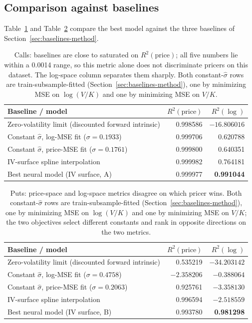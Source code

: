 \documentclass[11pt]{article}
\begin{document}
\subsection{Comparison against baselines}
\label{sec:results-baselines}
Table~\ref{tab:baselines-call} and Table~\ref{tab:baselines-put} compare the best model against the
three baselines of Section~\ref{sec:baselines-method}.

\begin{table}[t]
\centering
\small
\caption{Calls: baselines are close to saturated on $R^2(\text{price})$; all five numbers lie within a
0.0014 range, so this metric alone does not discriminate pricers on this dataset. The log-space column
separates them sharply. Both constant-$\hat\sigma$ rows are train-subsample-fitted
(Section~\ref{sec:baselines-method}), one by
minimizing MSE on $\log(V/K)$ and one by minimizing MSE on $V/K$.}
\label{tab:baselines-call}
\begin{tabular}{lrr}
\toprule
Baseline / model & $R^2(\text{price})$ & $R^2(\log)$ \\
\midrule
Zero-volatility limit (discounted forward intrinsic) & 0.998586 & $-16.806016$ \\
Constant $\hat\sigma$, log-MSE fit ($\sigma{=}0.1933$) & 0.999706 & 0.620788 \\
Constant $\hat\sigma$, price-MSE fit ($\sigma{=}0.1761$) & 0.999800 & 0.640351 \\
IV-surface spline interpolation & 0.999982 & 0.764181 \\
Best neural model (IV surface, A) & 0.999977 & \textbf{0.991044} \\
\bottomrule
\end{tabular}
\end{table}

\begin{table}[t]
\centering
\small
\caption{Puts: price-space and log-space metrics disagree on which pricer wins. Both
constant-$\hat\sigma$ rows are train-subsample-fitted (Section~\ref{sec:baselines-method}), one by
minimizing MSE on $\log(V/K)$ and
one by minimizing MSE on $V/K$; the two objectives select different constants and rank in opposite
directions on the two metrics.}
\label{tab:baselines-put}
\begin{tabular}{lrr}
\toprule
Baseline / model & $R^2(\text{price})$ & $R^2(\log)$ \\
\midrule
Zero-volatility limit (discounted forward intrinsic) & 0.535219 & $-34.203142$ \\
Constant $\hat\sigma$, log-MSE fit ($\sigma{=}0.4758$) & $-2.358206$ & $-0.388064$ \\
Constant $\hat\sigma$, price-MSE fit ($\sigma{=}0.2063$) & 0.925761 & $-3.358130$ \\
IV-surface spline interpolation & 0.996594 & $-2.518559$ \\
Best neural model (IV surface, B) & 0.993780 & \textbf{0.981298} \\
\bottomrule
\end{tabular}
\end{table}
\end{document}
